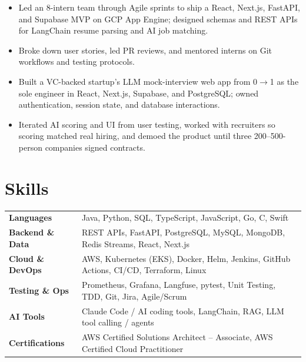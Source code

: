 \documentclass[11pt, letterpaper]{article}
\begin{document}
\vspace{1pt}
\begin{itemize}
  \item Led an 8-intern team through Agile sprints to ship a React, Next.js, FastAPI, and Supabase MVP on GCP App Engine; designed schemas and REST APIs for LangChain resume parsing and AI job matching.
  \item Broke down user stories, led PR reviews, and mentored interns on Git workflows and testing protocols.
\end{itemize}

\vspace{1pt}
\begin{itemize}
  \item Built a VC-backed startup's LLM mock-interview web app from 0$\to$1 as the sole engineer in React, Next.js, Supabase, and PostgreSQL; owned authentication, session state, and database interactions.
  \item Iterated AI scoring and UI from user testing, worked with recruiters so scoring matched real hiring, and demoed the product until three 200--500-person companies signed contracts.
\end{itemize}

\section{Skills}
\begin{tabularx}{\textwidth}{@{}l @{\hspace{7pt}} >{\raggedright\arraybackslash}X@{}}
  \textbf{Languages} & Java, Python, SQL, TypeScript, JavaScript, Go, C, Swift \\[1pt]
  \textbf{Backend \& Data} & REST APIs, FastAPI, PostgreSQL, MySQL, MongoDB, Redis Streams, React, Next.js \\[1pt]
  \textbf{Cloud \& DevOps} & AWS, Kubernetes (EKS), Docker, Helm, Jenkins, GitHub Actions, CI/CD, Terraform, Linux \\[1pt]
  \textbf{Testing \& Ops} & Prometheus, Grafana, Langfuse, pytest, Unit Testing, TDD, Git, Jira, Agile/Scrum \\[1pt]
  \textbf{AI Tools} & Claude Code / AI coding tools, LangChain, RAG, LLM tool calling / agents \\[1pt]
  \textbf{Certifications} & AWS Certified Solutions Architect -- Associate, AWS Certified Cloud Practitioner \\
\end{tabularx}
\end{document}
